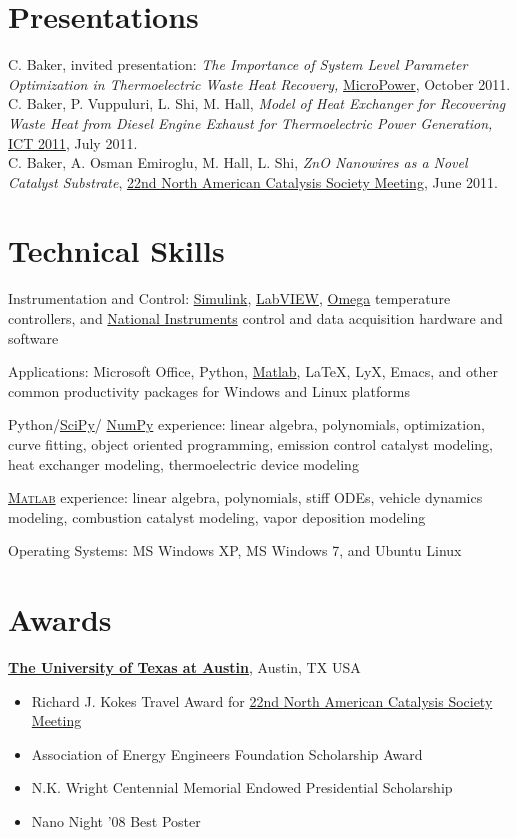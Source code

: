 \documentclass[line,margin]{res}
\begin{document}
\begin{resume}
\section{Presentations}
C. Baker, invited presentation: \textit{The Importance of System Level
Parameter Optimization in Thermoelectric Waste Heat Recovery,}
\href{http://www.micropower-global.com/our_company/texasstate/}{MicroPower},
October 2011. \\
C. Baker, P. Vuppuluri, L. Shi, M. Hall, \textit{Model of Heat Exchanger for
Recovering Waste Heat from Diesel Engine Exhaust for Thermoelectric
Power Generation,}
\href{http://ict2011.its.org/}{ICT 2011}, July 2011. \\
C. Baker, A. Osman Emiroglu, M. Hall, L. Shi, \textit{ZnO Nanowires as a
Novel Catalyst Substrate}, \href{http://www.22nam.org/}{22nd North
  American Catalysis Society Meeting}, June 2011.

\section{Technical Skills}
% 
Instrumentation and Control:
\href{http://www.mathworks.com/products/simulink/}{Simulink},
\href{http://www.ni.com/}{LabVIEW}, 
\href{http://www.omega.com/}{Omega} temperature controllers,
and
\href{http://www.ni.com}{National Instruments}
control and data acquisition hardware and software

Applications: Microsoft Office, Python,
\href{http://www.mathworks.com/products/matlab/}{Matlab}, \LaTeX, LyX,
Emacs, and other common productivity packages for Windows and Linux
platforms

Python/\href{http://www.scipy.org/}{SciPy}/%
\href{http://numpy.scipy.org/}{NumPy}
experience: linear algebra, polynomials, optimization, curve fitting,
object oriented programming, emission control catalyst modeling, heat
exchanger modeling, thermoelectric device modeling

\href{http://www.mathworks.com/products/matlab/}{\textsc{Matlab}}
experience: linear algebra, polynomials, stiff ODEs, vehicle dynamics
modeling, combustion catalyst modeling, vapor deposition modeling

Operating Systems: MS Windows XP, MS Windows 7, and Ubuntu Linux

\section{Awards}
% 
\href{http://www.utexas.edu/}{\textbf{The University of Texas at Austin}}, Austin, TX USA
\begin{itemize}
\item Richard J. Kokes Travel Award for
  \href{http://www.22nam.org/}{22nd North American Catalysis Society
    Meeting}
\item Association of Energy Engineers Foundation Scholarship Award
\item N.K. Wright Centennial Memorial Endowed Presidential Scholarship
\item Nano Night '08 Best Poster
\end{itemize}


\end{resume}
\end{document}
